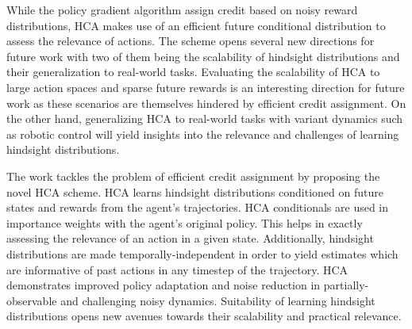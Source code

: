 \documentclass[11pt,letterpaper]{article}
\begin{document}
While the policy gradient algorithm assign credit based on noisy reward distributions, HCA makes use of an efficient future conditional distribution to assess the relevance of actions. The scheme opens several new directions for future work with two of them being the scalability of hindsight distributions and their generalization to real-world tasks. Evaluating the scalability of HCA to large action spaces and sparse future rewards is an interesting direction for future work as these scenarios are themselves hindered by efficient credit assignment. On the other hand, generalizing HCA to real-world tasks with variant dynamics such as robotic control will yield insights into the relevance and challenges of learning hindsight distributions. 

The work tackles the problem of efficient credit assignment by proposing the novel HCA scheme. HCA learns hindsight distributions conditioned on future states and rewards from the agent's trajectories. HCA conditionals are used in importance weights with the agent's original policy. This helps in exactly assessing the relevance of an action in a given state. Additionally, hindsight distributions are made temporally-independent in order to yield estimates which are informative of past actions in any timestep of the trajectory. HCA demonstrates improved policy adaptation and noise reduction in partially-observable and challenging noisy dynamics. Suitability of learning hindsight distributions opens new avenues towards their scalability and practical relevance. 
\end{document}
